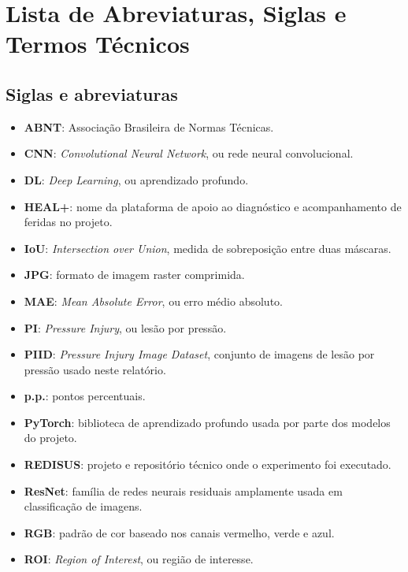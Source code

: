 \documentclass[
    12pt,
    openright,
    oneside,
    a4paper,
    chapter=TITLE,
    section=TITLE,
    brazil,
    sumario=tradicional,
    hidelinks
]{abntex2}
\begin{document}
\imprimircapa
\imprimirfolhaderosto*

\chapter*{Lista de Abreviaturas, Siglas e Termos Técnicos}

\section*{Siglas e abreviaturas}
\begin{itemize}
    \item \textbf{ABNT}: Associação Brasileira de Normas Técnicas.
    \item \textbf{CNN}: \textit{Convolutional Neural Network}, ou rede neural convolucional.
    \item \textbf{DL}: \textit{Deep Learning}, ou aprendizado profundo.
    \item \textbf{HEAL+}: nome da plataforma de apoio ao diagnóstico e acompanhamento de feridas no projeto.
    \item \textbf{IoU}: \textit{Intersection over Union}, medida de sobreposição entre duas máscaras.
    \item \textbf{JPG}: formato de imagem raster comprimida.
    \item \textbf{MAE}: \textit{Mean Absolute Error}, ou erro médio absoluto.
    \item \textbf{PI}: \textit{Pressure Injury}, ou lesão por pressão.
    \item \textbf{PIID}: \textit{Pressure Injury Image Dataset}, conjunto de imagens de lesão por pressão usado neste relatório.
    \item \textbf{p.p.}: pontos percentuais.
    \item \textbf{PyTorch}: biblioteca de aprendizado profundo usada por parte dos modelos do projeto.
    \item \textbf{REDISUS}: projeto e repositório técnico onde o experimento foi executado.
    \item \textbf{ResNet}: família de redes neurais residuais amplamente usada em classificação de imagens.
    \item \textbf{RGB}: padrão de cor baseado nos canais vermelho, verde e azul.
    \item \textbf{ROI}: \textit{Region of Interest}, ou região de interesse.
\end{itemize}
\end{document}
